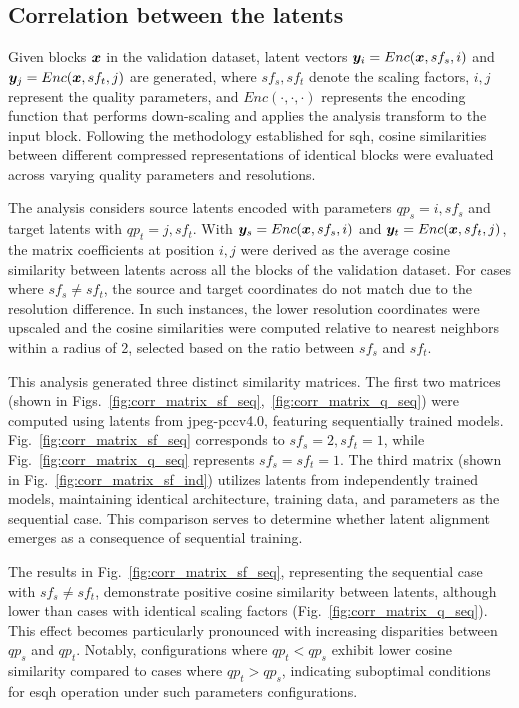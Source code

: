 \subsection{Correlation between the latents}

Given blocks $\x$ in the validation dataset, latent vectors
$\boldsymbol{y}_{i} = Enc(\x, sf_s, i)$ and $\boldsymbol{y}_{j} = Enc(\x, sf_t, j)$
are generated, where $sf_s, sf_t$ denote the scaling factors,
$i, j$ represent the quality parameters, and $Enc(\cdot, \cdot, \cdot)$
represents the encoding function that performs down-scaling and applies the analysis transform to the input block.
Following the methodology established for \gls{sqh}, cosine similarities between different compressed representations of identical blocks were evaluated across varying quality parameters and resolutions.


The analysis considers source latents encoded with parameters $qp_s=i, sf_s$ and target latents with $qp_t=j, sf_t$. With $\y_s = Enc(\x, sf_s, i)$ and $\y_t = Enc(\x, sf_t, j)$, the matrix coefficients at position $i, j$ were derived as the average cosine similarity between latents across all the blocks of the validation dataset. For cases where $sf_s \neq sf_t$, the source and target coordinates do not match due to the resolution difference. In such instances, the lower resolution coordinates were upscaled and the cosine similarities were computed relative to nearest neighbors within a radius of 2, selected based on the ratio between $sf_s$ and $sf_t$.

This analysis generated three distinct similarity matrices. The first two matrices (shown in Figs.~\ref{fig:corr_matrix_sf_seq},~\ref{fig:corr_matrix_q_seq}) were computed using latents from \gls{jpeg-pcc}v4.0, featuring sequentially trained models. Fig.~\ref{fig:corr_matrix_sf_seq} corresponds to $sf_s=2, sf_t=1$, while Fig.~\ref{fig:corr_matrix_q_seq} represents $sf_s=sf_t=1$. The third matrix (shown in Fig.~\ref{fig:corr_matrix_sf_ind}) utilizes latents from independently trained models, maintaining identical architecture, training data, and parameters as the sequential case. This comparison serves to determine whether latent alignment emerges as a consequence of sequential training.

The results in Fig.~\ref{fig:corr_matrix_sf_seq}, representing the sequential case with $sf_s\neq sf_t$, demonstrate positive cosine similarity between latents, although lower than cases with identical scaling factors (Fig.~\ref{fig:corr_matrix_q_seq}). This effect becomes particularly pronounced with increasing disparities between $qp_s$ and $qp_t$.
Notably, configurations where $qp_t < qp_s$ exhibit lower cosine similarity compared to cases where $qp_t > qp_s$, indicating suboptimal conditions for \gls{esqh} operation under such parameters configurations.

